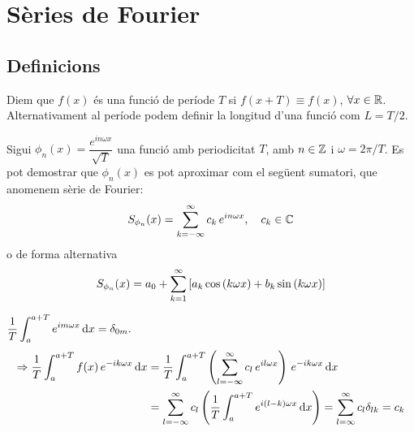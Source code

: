 \section{Sèries de Fourier}
\subsection{Definicions}
\begin{defi}
    Diem que $f(x)$ és una funció de període $T$ si $f(x+T) \equiv f(x)$, $\forall x \in \mathbb{R}$. Alternativament al període podem definir la longitud d'una funció com $L = T/2$.
\end{defi}

\begin{defi}
    Sigui $\phi_{n}(x) = \dfrac{e^{i n \omega x}}{\sqrt{T}}$ una funció amb periodicitat $T$, amb $n \in \mathbb{Z}$ i $\omega = 2\pi/T$. Es pot demostrar que $\phi_{n}(x)$ es pot aproximar com el següent sumatori, que anomenem sèrie de Fourier:
    \begin{align}\label{eq:fourier-c}
        S_{\phi_{n}}(x) = \sum_{k=-\infty}^{\infty} c_{k}\,e^{i n \omega x}, \quad c_{k} \in \mathbb{C}
    \end{align}
    o de forma alternativa
    \begin{align}\label{eq:fourier-ab}
        S_{\phi_{n}}(x) = a_{0} + \sum_{k=1}^{\infty} \left[ a_{k} \cos \left( k \omega x \right) + b_{k} \sin \left( k \omega x \right) \right]
    \end{align}
\end{defi}
\begin{sproof} $\displaystyle \frac{1}{T} \int_{a}^{a+T} e^{im\omega x} \mathop{}\!\mathrm{d} x = \delta_{0m}.$
    \begin{align*}
    \begin{aligned}
         \Rightarrow \frac{1}{T} \int_{a}^{a+T} f(x)\,e^{-ik\omega x} \mathop{}\!\mathrm{d} x &= \frac{1}{T} \int_{a}^{a+T} \left( \sum_{l=-\infty}^{\infty} c_{l}\,e^{il\omega x} \right)\,e^{-ik\omega x} \mathop{}\!\mathrm{d} x \\
         &= \sum_{l=-\infty}^{\infty} c_{l} \left( \frac{1}{T}  \int_{a}^{a+T} e^{i(l-k)\omega x} \mathop{}\!\mathrm{d} x \right) = \sum_{l=\infty}^{\infty} c_{l} \delta_{lk} = c_{k}
    \end{aligned}
    \end{align*}
\end{sproof}

